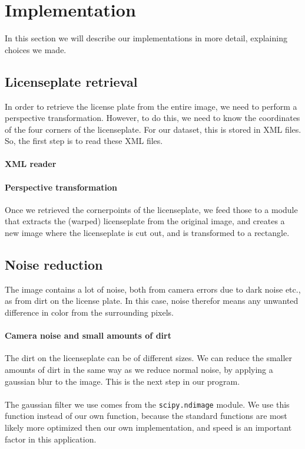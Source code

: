 \documentclass[a4paper]{article}
\begin{document}
\section{Implementation}

In this section we will describe our implementations in more detail, explaining
choices we made.

\subsection*{Licenseplate retrieval}

In order to retrieve the license plate from the entire image, we need to perform
a perspective transformation. However, to do this, we need to know the 
coordinates of the four corners of the licenseplate. For our dataset, this is
stored in XML files. So, the first step is to read these XML files.

\paragraph*{XML reader}



\paragraph*{Perspective transformation}

Once we retrieved the cornerpoints of the licenseplate, we feed those to a
module that extracts the (warped) licenseplate from the original image, and
creates a new image where the licenseplate is cut out, and is transformed to a
rectangle.

\subsection*{Noise reduction}

The image contains a lot of noise, both from camera errors due to dark noise etc.,
as from dirt on the license plate. In this case, noise therefor means any unwanted
difference in color from the surrounding pixels.

\paragraph*{Camera noise and small amounts of dirt}

The dirt on the licenseplate can be of different sizes. We can reduce the smaller
amounts of dirt in the same way as we reduce normal noise, by applying a gaussian
blur to the image. This is the next step in our program.\\
\\
The gaussian filter we use comes from the \texttt{scipy.ndimage} module. We use
this function instead of our own function, because the standard functions are
most likely more optimized then our own implementation, and speed is an important
factor in this application.
\end{document}
